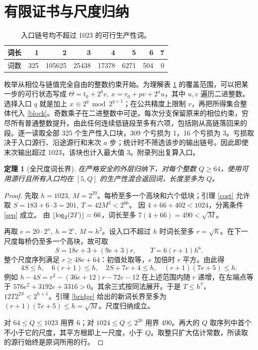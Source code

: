\documentclass[UTF8,12pt,a4paper,fontset=fandol,scheme=plain]{ctexart}
\theoremstyle{cn}\newtheorem{thm}{定理}\newtheorem{lem}[thm]{引理}
\begin{document}
\section{有限证书与尺度归纳}
\begin{table}[h!]\centering
\caption{入口链号均不超过 1023 的可行生产性词。}\label{base}
\begin{tabular}{c*{7}{r}}\toprule
词长 &1&2&3&4&5&6&7\\\midrule
词数 &325&105625&25438&17378&6271&504&0\\\bottomrule
\end{tabular}
\end{table}
枚举从相位与链值完全自由的整数约束开始。为理解表 \ref{base} 的覆盖范围，可以把某一步的可行状态写成
\(\Theta=t_0+2^b v,\ x=r_0+pv+2^a u\)，其中 \(u,v\) 遍历二进整数。选择入口 \(q\) 就是加上 \(x\equiv2^q\bmod 2^{q+1}\)；在公共精度上限制 \(v\)，再把所得集合整体代入 \eqref{block}。奇数乘子在二进整数中可逆。每次分支保留原来的相位约束，穷尽所有普通整数提升。由此任何连续低链段至多有六项，包括刚从高链落回来的段。逐一读取全部 325 个生产性入口块，309 个亏损为 1，16 个亏损为 3。亏损取决于入口源行、沿途源行和末次 \(a\) 步；统计时不筛选该步的输出链号。因此即使末次输出超过 1023，该块也计入最大值 3。附录列出复算入口。

\begin{thm}[全尺度词长界]\label{word}
在严格安全的外层归纳下，对每个整数 \(Q\ge64\)，使用可用源行且所有入口均在 \([5,Q]\) 的生产性混合返回词，长度至多为 \(Q\)。
\end{thm}
\begin{proof}
先取 \(h=1023,\ M=2^{20}\)。每桥至多一个高块和六个低块；引理 \ref{cost} 允许取 \(S=183+6\cdot3=201,\ T=42M^3<2^{66}\)。
因 \(4+66+402<1024\)，分离条件 \eqref{sep} 成立。
由 \(\lfloor\log_2(2T)\rfloor=66\)，词长至多 \(7(4+66)=490<\sqrt M\)。

再取 \(e=20\cdot2^n,\ h=2^e,\ M=h^2\)。设入口不超过 \(h\) 时词长至多 \(r=\sqrt h\)。在下一尺度每桥仍至多一个高块，故可取
\[
        S=18e+3+(9e+3)r,\qquad T=6(r+1)h^6 .
\]
整个尺度序列满足 \(r\ge48e+64\)：初值处取等，\(e\) 加倍时 \(r\) 平方。由此得
\[
 4S\le h,\quad 6(r+1)\le h,\quad 2S+7e+4\le h,\quad (r+1)(7e+5)\le h .
\]
例如 \(h-4S=r^2-(36e+12)r-72e-12\) 在上述范围内随 \(r\) 递增，在左端点等于 \(576e^2+3192e+3316>0\)。其余三式按同法展开。于是 \(T\le h^7\)，\(12T2^{2S}<2^{h+1}\)。引理 \ref{bridge} 给出的新词长界至多为 \((r+1)(7e+5)\le h=\sqrt M\)。尺度归纳成立。

对 \(64\le Q\le1023\) 用界 6；对 \(1024\le Q\le2^{20}\) 用界 490。再大的 \(Q\) 取序列中首个不小于它的尺度，其平方根即上一尺度，小于 \(Q\)。取整只扩大估计常数，所读取的源行始终是原词所用的行。
\end{proof}
\end{document}
